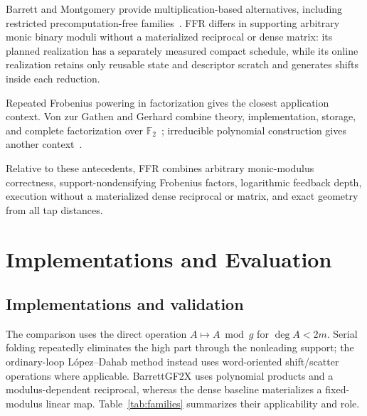 \documentclass{mcom-l}
\numberwithin{equation}{section}
\theoremstyle{definition}
\theoremstyle{remark}
\newcommand{\Ftwo}{\mathbb{F}_2}
\begin{document}
Barrett and Montgomery provide multiplication-based alternatives, including
restricted precomputation-free families~\cite{KnezevicEtAl2008}. FFR differs
in supporting arbitrary monic binary moduli without a materialized reciprocal
or dense matrix: its planned realization has a separately measured compact
schedule, while its online realization retains only reusable state and
descriptor scratch and generates shifts inside each reduction.

Repeated Frobenius powering in factorization gives the closest application
context.  Von zur Gathen and Gerhard combine theory, implementation, storage,
and complete factorization over $\Ftwo$~\cite{GathenGerhard2002}; irreducible
polynomial construction gives another context~\cite{Shoup1990}.

Relative to these antecedents, FFR combines arbitrary monic-modulus
correctness, support-nondensifying Frobenius factors, logarithmic feedback depth,
execution without a materialized dense reciprocal or matrix, and exact
geometry from all tap distances.

\section{Implementations and Evaluation}
\label{sec:evaluation}

\subsection{Implementations and validation}

The comparison uses the direct operation $A\mapsto A\bmod g$ for
$\deg A<2m$.  Serial folding repeatedly eliminates the high part through the
nonleading support; the ordinary-loop L\'opez--Dahab method instead uses
word-oriented shift/scatter operations where applicable.  BarrettGF2X uses
polynomial products and a modulus-dependent reciprocal, whereas the dense
baseline materializes a fixed-modulus linear map.  Table~\ref{tab:families}
summarizes their applicability and role.
\end{document}
